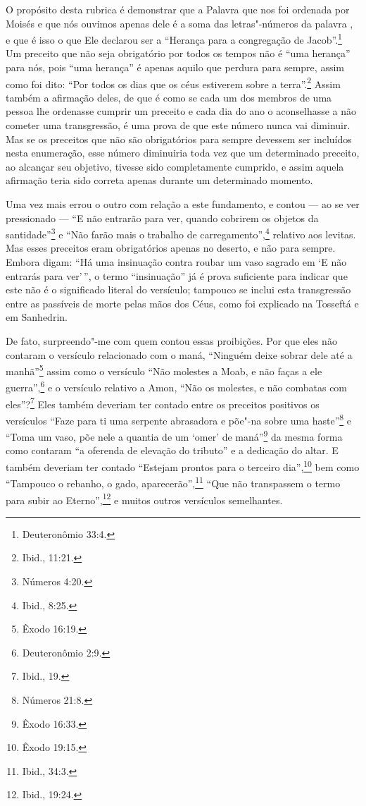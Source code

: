 O propósito desta rubrica é demonstrar que a Palavra que nos foi
ordenada por Moisés e que nós ouvimos apenas dele é a soma das
letras"-números da palavra , e que é isso o que Ele declarou ser a
``Herança para a congregação de Jacob\starr''.\footnote{Deuteronômio 33:4.} Um preceito
que não seja obrigatório por todos os tempos não é ``uma herança'' para
nós, pois ``uma herança'' é apenas aquilo que perdura para sempre,
assim como foi dito: ``Por todos os dias que os céus estiverem sobre a
terra''.\footnote{Ibid., 11:21.} Assim também a afirmação deles, de que é como
se cada um dos membros de uma pessoa lhe ordenasse cumprir um preceito
e cada dia do ano o aconselhasse a não cometer uma transgressão, é uma
prova de que este número nunca vai diminuir. Mas se os preceitos que não
são obrigatórios para sempre devessem ser incluídos nesta enumeração,
esse número diminuiria toda vez que um determinado preceito, ao alcançar
seu objetivo, tivesse sido completamente cumprido, e assim aquela
afirmação teria sido correta apenas durante um determinado momento.

Uma vez mais errou o outro com relação a este fundamento, e contou ---
ao se ver pressionado --- ``E não entrarão para ver, quando cobrirem os
objetos da santidade''\footnote{Números 4:20.} e ``Não farão mais o trabalho de
carregamento'',\footnote{Ibid., 8:25.} relativo aos levitas\starr. Mas esses preceitos
eram obrigatórios apenas no deserto, e não para sempre. Embora digam:
``Há uma insinuação contra roubar um vaso sagrado em `E não entrarás
para ver'\,'', o termo ``insinuação'' já é prova suficiente para indicar
que este não é o significado literal do versículo; tampouco se inclui
esta transgressão entre as passíveis de morte pelas mãos dos Céus, como
foi explicado na Tosseftá\starr{} e em Sanhedrin\starr.

De fato, surpreendo"-me com quem contou essas proibições. Por que eles
não contaram o versículo relacionado com o maná, ``Ninguém deixe sobrar
dele até a manhã''\footnote{Êxodo 16:19.} assim como o versículo ``Não molestes a
Moab\starr, e não faças a ele guerra'',\footnote{Deuteronômio 2:9.} e o versículo
relativo a Amon\starr, ``Não os molestes, e não combatas com eles''?\footnote{Ibid.,
19.} Eles também deveriam ter contado entre os preceitos positivos os
versículos ``Faze para ti uma serpente abrasadora e põe"-na sobre uma
haste''\footnote{Números 21:8.} e ``Toma um vaso, põe nele a quantia de um `omer'
de maná''\footnote{Êxodo 16:33.} da mesma forma como contaram
``a oferenda de elevação do tributo'' e a dedicação do altar. E também
deveriam ter contado ``Estejam prontos para o terceiro dia'',\footnote{Êxodo
19:15.} bem como ``Tampouco o rebanho, o gado, aparecerão'',\footnote{Ibid.,
34:3.} ``Que não transpassem o termo para subir ao Eterno'',\footnote{Ibid.,
19:24.} e muitos outros versículos semelhantes.


